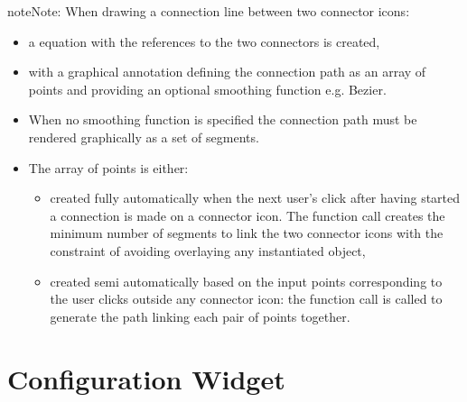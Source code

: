 \documentclass[letterpaper,10pt, openany,english]{sphinxmanual}
\begin{document}
\begin{sphinxadmonition}{note}{Note:}
When drawing a connection line between two connector icons:
\begin{itemize}
\item {} 
a  equation with the references to the two connectors is created,

\item {} 
with a graphical annotation defining the connection path as an array of points and providing an optional smoothing function e.g. Bezier.

\item {} 
When no smoothing function is specified the connection path must be rendered graphically as a set of segments.

\item {} 
The array of points is either:
\begin{itemize}
\item {} 
created fully automatically when the next user’s click after having started a connection is made on a connector icon. The function call  creates the minimum number of  segments to link the two connector icons with the constraint of avoiding overlaying any instantiated object,

\item {} 
created semi automatically based on the input points corresponding to the user clicks outside any connector icon: the function call  is called to generate the path linking each pair of points together.

\end{itemize}

\end{itemize}
\end{sphinxadmonition}


\section{Configuration Widget}
\label{\detokenize{requirements:configuration-widget}}\label{\detokenize{requirements:par-configuration-widget}}
\end{document}
